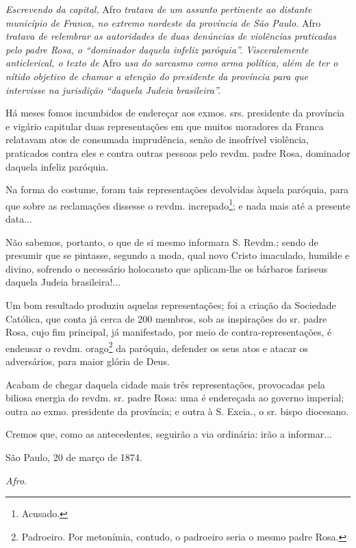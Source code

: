 \begin{didascalia}
\emph{Escrevendo da capital,} Afro \emph{tratava de um assunto
pertinente ao distante município de Franca, no extremo nordeste da
província de São Paulo.} Afro \emph{tratava de relembrar as autoridades
de duas denúncias de violências praticadas pelo padre Rosa, o ``dominador
daquela infeliz paróquia''. Visceralemente anticlerical, o texto de} Afro
\emph{usa do sarcasmo como arma política, além de ter o nítido objetivo
de chamar a atenção do presidente da província para que intervisse na
jurisdição ``daquela Judeia brasileira''.}
\end{didascalia}

\asterisc{}

Há meses fomos incumbidos de endereçar aos exmos. srs. presidente da
província e vigário capitular duas representações em que muitos
moradores da Franca relatavam atos de consumada imprudência, senão de
insofrível violência, praticados contra eles e contra outras pessoas
pelo revdm. padre Rosa, dominador daquela infeliz paróquia.

Na forma do costume, foram tais representações devolvidas àquela
paróquia, para que sobre as reclamações dissesse o revdm.
increpado\footnote{ Acusado.}; e nada mais até a presente data...

Não sabemos, portanto, o que de si mesmo informara S. Revdm.; sendo de
presumir que se pintasse, segundo a moda, qual novo Cristo imaculado,
humilde e divino, sofrendo o necessário holocausto que aplicam-lhe os
bárbaros fariseus daquela Judeia brasileira!...

Um bom resultado produziu aquelas representações; foi a criação da
Sociedade Católica, que conta já cerca de 200 membros, sob as
inspirações do sr. padre Rosa, cujo fim principal, já manifestado, por
meio de contra-representações, é endeusar o revdm. orago\footnote{
  Padroeiro. Por metonímia, contudo, o padroeiro seria o mesmo padre
  Rosa.} da paróquia, defender os seus atos e atacar os adversários,
para maior glória de Deus.

Acabam de chegar daquela cidade mais três representações, provocadas
pela biliosa energia do revdm. sr. padre Rosa: uma é endereçada ao
governo imperial; outra ao exmo. presidente da província; e outra à S.
Excia., o sr. bispo diocesano.

Cremos que, como as antecedentes, seguirão a via ordinária: irão a
informar...

São Paulo, 20 de março de 1874.

\emph{Afro}.

